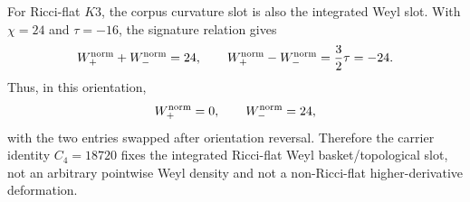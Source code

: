 
\makeatletter
{}
\makeatother
\providecommand{\PSp}{\mathrm{PSp}}
\providecommand{\Aut}{\mathrm{Aut}}
\providecommand{\spec}{\operatorname{spec}}


\begin{remark}
\label{rem:k3-weyl-signature-split}
For Ricci-flat $K3$, the corpus curvature slot is also the integrated Weyl slot.
With $\chi=24$ and $\tau=-16$, the signature relation gives
\[
  W_+^{\rm norm}+W_-^{\rm norm}=24,
  \qquad
  W_+^{\rm norm}-W_-^{\rm norm}=\frac32\tau=-24.
\]
Thus, in this orientation,
\[
  W_+^{\rm norm}=0,\qquad W_-^{\rm norm}=24,
\]
with the two entries swapped after orientation reversal.  Therefore the carrier
identity $C_4=18720$ fixes the integrated Ricci-flat Weyl basket/topological
slot, not an arbitrary pointwise Weyl density and not a non-Ricci-flat
higher-derivative deformation.
\end{remark}
